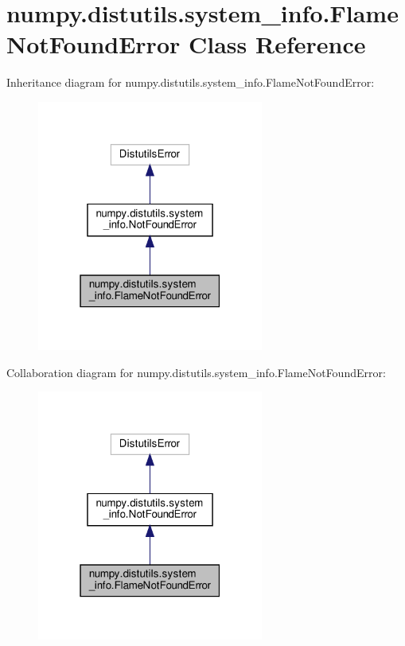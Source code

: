 \hypertarget{classnumpy_1_1distutils_1_1system__info_1_1FlameNotFoundError}{}\section{numpy.\+distutils.\+system\+\_\+info.\+Flame\+Not\+Found\+Error Class Reference}
\label{classnumpy_1_1distutils_1_1system__info_1_1FlameNotFoundError}


Inheritance diagram for numpy.\+distutils.\+system\+\_\+info.\+Flame\+Not\+Found\+Error\+:
\nopagebreak
\begin{figure}[H]
\begin{center}
\leavevmode
\includegraphics[width=211pt]{classnumpy_1_1distutils_1_1system__info_1_1FlameNotFoundError__inherit__graph}
\end{center}
\end{figure}


Collaboration diagram for numpy.\+distutils.\+system\+\_\+info.\+Flame\+Not\+Found\+Error\+:
\nopagebreak
\begin{figure}[H]
\begin{center}
\leavevmode
\includegraphics[width=211pt]{classnumpy_1_1distutils_1_1system__info_1_1FlameNotFoundError__coll__graph}
\end{center}
\end{figure}


